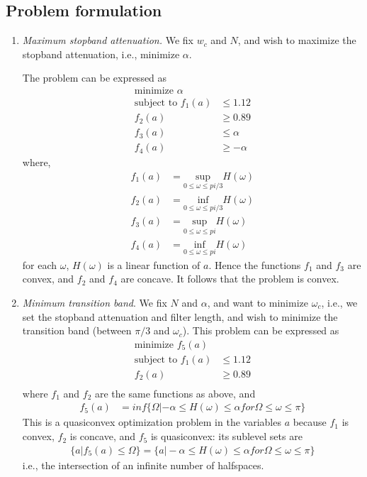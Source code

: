 \documentclass[conference]{IEEEtran}
\begin{document}
\subsection{Problem formulation}
\begin{enumerate}[label=(\alph*)]
\item \textit{Maximum stopband attenuation.} We fix $w_c$ and $N$, and wish to maximize the stopband attenuation, i.e., minimize $\alpha$.

The problem can be expressed as
\begin{align}
\text{minimize } \alpha\\
\text{subject to } f_1(a)&\le 1.12\\
				   f_2(a)&\ge 0.89\\
				   f_3(a)&\le \alpha\\
				   f_4(a)&\ge -\alpha
\end{align}
where,
\begin{align}
f_1(a) &= \underset{0\le \omega \le pi/3}{\text{sup}}H(\omega)\\
f_2(a) &= \underset{0\le \omega \le pi/3}{\text{inf}}H(\omega)\\
f_3(a) &= \underset{0\le \omega \le pi}{\text{sup}}H(\omega)\\
f_4(a) &= \underset{0\le \omega \le pi}{\text{inf}}H(\omega)
\end{align}
for each $\omega$, $H(\omega)$ is a linear function of $a$. Hence the functions $f_1$ and $f_3$ are convex, and $f_2$ and $f_4$ are concave. It follows that the problem is convex.

\item \textit{Minimum transition band}. We fix $N$ and $\alpha$, and want to minimize $\omega_c$, i.e., we set the stopband attenuation and filter length, and wish to minimize the transition band (between $\pi/3$ and $\omega_c$).
This problem can be expressed as
\begin{align}
\text{minimize } f_5(a)\\
\text{subject to } f_1(a)&\le 1.12\\
				   f_2(a)&\ge 0.89\\
\end{align}
where $f_1$ and $f_2$ are the same functions as above, and
\begin{align}
f_5(a) &= inf\{\Omega| -\alpha\le H(\omega)\le \alpha for \Omega \le \omega \le \pi\}
\end{align}
This is a quasiconvex optimization problem in the variables $a$ because $f_1$ is convex, $f_2$ is concave, and $f_5$ is quasiconvex: its sublevel sets are
\begin{align}
\{a | f_5(a)\le\Omega\} = \{a| -\alpha\le H(\omega)\le \alpha for \Omega \le \omega \le \pi\}
\end{align}
i.e., the intersection of an infinite number of halfspaces.


\end{enumerate}
\end{document}

